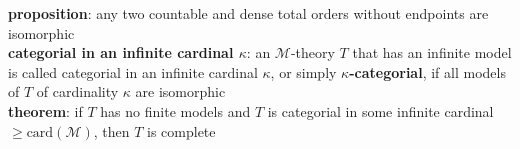 \documentclass[a4paper]{article}
\begin{document}
\begin{framed}
	\noindent
	\textbf{proposition}: any two countable and dense total orders without endpoints are isomorphic\\
	
	\noindent
	\textbf{categorial in an infinite cardinal $\kappa$}: an $\mathscr{M}$-theory $T$ that has an infinite model is called categorial in an infinite cardinal $\kappa$, or simply $\kappa$\textbf{-categorial}, if all models of $T$ of cardinality $\kappa$ are isomorphic\\
	
	\noindent
	\textbf{theorem}: if $T$ has no finite models and $T$ is categorial in some infinite cardinal $\geq \text{card}(\mathscr{M})$, then $T$ is complete
\end{framed}

\end{document}
